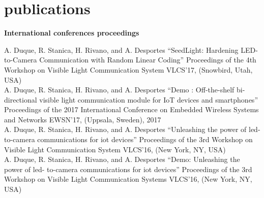 \documentclass[]{cv-style}          %
\begin{document}
\section{publications}
 \vspace{-0.2cm}
\large{\textbf{International conferences proceedings}}

\normalsize
\begin{publist}
\pub
{A. Duque, R. Stanica, H. Rivano, and A. Desportes}
{“SeedLight: Hardening LED-to-Camera Communication with Random Linear Coding”}
{Proceedings of the 4th Workshop on Visible Light Communication System}
{VLCS’17, (Snowbird, Utah, USA)}\\
\pub
{A. Duque, R. Stanica, H. Rivano, and A. Desportes}
{“Demo : Off-the-shelf bi-directional visible light communication module for IoT devices and smartphones”}
{Proceedings of the 2017 International Conference on Embedded Wireless Systems and Networks}
{EWSN’17, (Uppsala, Sweden), 2017}\\
\pub
  {A. Duque, R. Stanica, H. Rivano, and A. Desportes}
  {“Unleashing the power of led- to-camera communications for iot devices”}
  {Proceedings of the 3rd Workshop on Visible Light Communication System}
  {VLCS’16, (New York, NY, USA)}\\
\pub
  {A. Duque, R. Stanica, H. Rivano, and A. Desportes} {“Demo: Unleashing the power of led- to-camera communications for iot devices”} {Proceedings of the 3rd Workshop on Visible Light Communication Systems} {VLCS’16, (New York, NY, USA)}

\end{publist}



\end{document}
